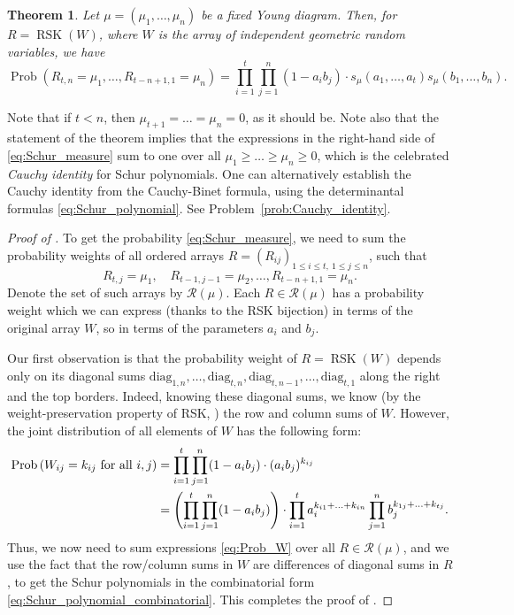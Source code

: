 \documentclass[letterpaper,11pt,oneside,reqno]{article}
\numberwithin{equation}{section}
\newtheorem{theorem}[proposition]{Theorem}
\theoremstyle{definition}
\begin{document}
\begin{theorem}
	\label{thm:Schur_measure}
	Let $\mu=(\mu_1,\ldots,\mu_n)$ be a fixed Young diagram.
	Then, for $R=\operatorname{RSK}(W)$, where $W$ is the array of independent geometric random variables,
	we have
	\begin{equation}
		\label{eq:Schur_measure}
		\operatorname{Prob}\left( R_{t,n}=\mu_1, \ldots, R_{t-n+1,1}=\mu_n \right)
		=
		\prod_{i=1}^t\prod_{j=1}^n
		(1-a_i b_j)\cdot s_\mu(a_1,\ldots,a_t )s_\mu(b_1,\ldots,b_n ).
	\end{equation}
\end{theorem}
Note that if $t<n$, then $\mu_{t+1}=\ldots=\mu_n=0 $, as it should be.
Note also that the statement of the theorem implies that the
expressions in the right-hand side of \eqref{eq:Schur_measure}
sum to one over all $\mu_1\ge \ldots\ge \mu_n\ge0 $,
which is the celebrated \emph{Cauchy identity} for Schur polynomials.
One can alternatively establish the Cauchy identity from the
Cauchy-Binet formula, using the determinantal formulas
\eqref{eq:Schur_polynomial}. See Problem~\ref{prob:Cauchy_identity}.
\begin{proof}[Proof of ]
	To get the probability
	\eqref{eq:Schur_measure}, we need to sum the probability weights of all
	ordered arrays $R=(R_{ij})_{1\le i\le t,\ 1\le j\le n}$, such that
	\begin{equation*}
		R_{t,j}=\mu_1,\quad R_{t-1,j-1}=\mu_2,\ldots,
		R_{t-n+1,1}=\mu_n.
	\end{equation*}
	Denote the set of such arrays by $\mathcal{R}(\mu)$.
	Each $R\in \mathcal{R}(\mu)$ has a probability weight which we can express (thanks to the
	RSK bijection) in terms of the original array $W$,
	so in terms of the parameters $a_i$ and $b_j$.

	Our first observation is that the probability weight of $R=\operatorname{RSK}(W)$ depends only on its
	diagonal sums $\mathrm{diag}_{1,n},\ldots,\mathrm{diag}_{t,n},\mathrm{diag}_{t,n-1},\ldots,\mathrm{diag}_{t,1} $
	along the right and the top borders.
	Indeed, knowing these diagonal sums, we know (by the weight-preservation property of RSK, )
	the row and column sums of $W$. However, the joint distribution of all
	elements of $W$ has the following form:
	\begin{equation}
		\label{eq:Prob_W}
		\begin{split}
			\operatorname{Prob}\left( W_{ij}=k_{ij}
			\ \textnormal{for all } i,j \right)
			&=
			\prod_{i=1}^t\prod_{j=1}^n
			(1-a_i b_j)\cdot (a_ib_j)^{k_{ij}} \\
			&=
			\Biggl(\prod_{i=1}^t\prod_{j=1}^n
			(1-a_i b_j)\Biggr)
			\cdot
			\prod_{i=1}^t a_i^{k_{i1}+\ldots+k_{in}}
			\prod_{j=1}^n b_j^{k_{1j}+\ldots+k_{tj}}.
		\end{split}
	\end{equation}
	Thus, we now need to sum expressions
	\eqref{eq:Prob_W} 
	over all $R\in \mathcal{R}(\mu)$,
	and we use the fact that the row/column sums in $W$
	are differences of diagonal sums in $R$, to get the Schur polynomials
	in the combinatorial form 
	\eqref{eq:Schur_polynomial_combinatorial}.
	This completes the proof of .
\end{proof}
\end{document}
